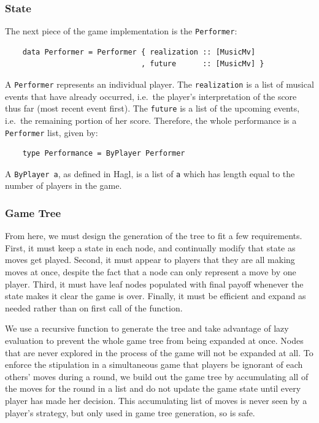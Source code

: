 \documentclass{article}
\begin{document}
\subsubsection{State}
The next piece of the game implementation is the \texttt{Performer}:

\begin{verbatim}
    data Performer = Performer { realization :: [MusicMv]
                               , future      :: [MusicMv] }
\end{verbatim}

A \texttt{Performer} represents an individual player. The 
\texttt{realization} is
a list of musical events that have already occurred, i.e.~the player's
interpretation of the score thus far (most recent event first). The
\texttt{future} is a list of the upcoming events, i.e.~the remaining portion of
her score. Therefore, the whole performance is a \texttt{Performer} list, given by:

\begin{verbatim}
    type Performance = ByPlayer Performer
\end{verbatim}

A \texttt{ByPlayer a}, as defined in Hagl, is a list of \texttt{a} which
has length equal to the number of players in the game.

\subsubsection{Game Tree}
From here, we must design the generation of the tree to fit a few
requirements. First, it must keep a state in each node, and continually
modify that state as moves get played. Second, it must appear to players
that they are all making moves at once, despite the fact that a node can
only represent a move by one player. Third, it must have leaf nodes
populated with final payoff whenever the state makes it clear the game
is over. Finally, it must be efficient and expand as needed rather than
on first call of the function.

We use a recursive function to generate the tree and take advantage of
lazy evaluation to prevent the whole game tree from being expanded at
once. Nodes that are never explored in the process of the game will
not be expanded at all. To enforce the stipulation in a simultaneous
game that players be ignorant of each others' moves during a round, 
we build out the game tree by accumulating all of the moves for
the round in a list and do not update the game state until every player
has made her decision. This accumulating list of moves is never seen by
a player's strategy, but only used in game tree generation, so is safe.
\end{document}
